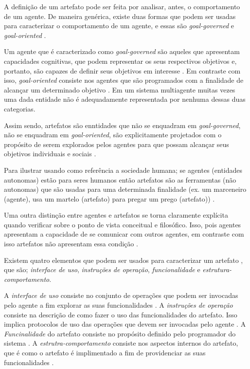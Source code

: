 A definição de um artefato pode ser feita por analisar, antes, o comportamento de um agente. De maneira genérica, existe duas formas que podem ser
usadas para caracterizar o comportamento de um agente, e essas são \textit{goal-governed} e \textit{goal-oriented} \cite{relationwithagentprogram} \cite{programingagentartefact}.

Um agente que é caracterizado como \textit{goal-governed} são aqueles que apresentam capacidades cognitivas, que podem representar os seus respectivos objetivos
e, portanto, são capazes de definir seus objetivos em interesse \cite{relationwithagentprogram} \cite{programingagentartefact}. Em contraste com isso, \textit{goal-oriented} consiste nos agentes que são programados
com a finalidade de alcançar um determinado objetivo \cite{relationwithagentprogram} \cite{programingagentartefact}. Em um sistema multiagente muitas vezes
uma dada entidade não é adequadamente representada por nenhuma dessas duas categorias. 

Assim sendo, artefatos são enntidades que não se enquadram em  \textit{goal-governed}, não se enquadram em \textit{goal-oriented}, são explicitamente projetados com o propósito de serem explorados pelos agentes para que
possam alcançar seus objetivos individuais e sociais \cite{programingagentartefact}. 

Para ilustrar usando como referência a sociedade humana; se agentes (entidades autonomas) estão para seres humanos então artefatos são as ferramentas (não autonomas)
que são usadas para uma determinada finalidade (ex. um marceneiro (agente), usa um martelo (artefato) para pregar um prego (artefato)) \cite{programingagentartefact}.

Uma outra distinção entre agentes e artefatos se torna claramente explícita quando verificar sobre o ponto de vista conceitual e filosófico. Isso, pois
agentes apresentam a capacidade de se comunicar com outros agentes, em contraste com isso artefatos não apresentam essa condição \cite{programingagentartefact}.

Existem quatro elementos que podem ser usados para caracterizar um artefato \cite{programingagentartefact}, que são; \textit{interface de uso}, \textit{instruções de operação},
\textit{funcionalidade} e \textit{estrutura-comportamento}.

A \textit{interface de uso} consiste no conjunto de operações que podem ser invocadas pelo agente a fim explorar as suas funcionalidades \cite{programingagentartefact}. 
A \textit{instruções de operação} consiste na descrição de como fazer o uso das funcionalidades do artefato. Isso implica protocolos de uso das operações 
que devem ser invocadas pelo agente \cite{programingagentartefact}. A \textit{Funcinalidade} do artefato consiste no propósito definido pelo programador 
do sistema \cite{programingagentartefact}. A \textit{estrutra-comportamento} consiste nos aspectos internos do artefato, que é como o artefato é implimentado
a fim de providenciar as suas funcionalidades \cite{programingagentartefact}.    

\cite{cartago}
